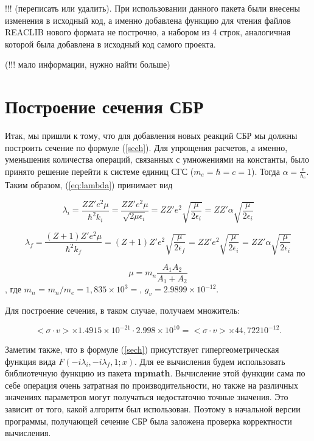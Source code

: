 \documentclass[%
master,    %
natbib,      %
subf,        %
href,        %
colorlinks,  %
]{disser}
\begin{document}
!!! (переписать или удалить). При использовании данного пакета были внесены изменения в исходный код, а именно добавлена функцию для чтения файлов REACLIB нового формата не построчно, а набором из 4 строк, аналогичная которой была добавлена в исходный код самого проекта.

(!!! мало информации, нужно найти больше)

\section{Построение сечения СБР}

Итак, мы пришли к тому, что для добавления новых реакций СБР мы должны построить сечение по формуле (\ref{sech}). Для упрощения расчетов, а именно, уменьшения количества операций, связанных с умножениями на константы, было принято решение перейти к системе единиц СГС ($m_e = \hbar = c = 1$). Тогда $\alpha = \frac{e}{\hbar_c}$. Таким образом, (\ref{eq:lambda}) принимает вид

\begin{equation}
\lambda_i = \frac{Z Z' e^2 \mu}{\hbar^2 k_i} = \frac{Z Z' e^2 \mu}{\sqrt{2\mu \epsilon_i}} = Z Z' e^2 \sqrt{\frac{\mu}{2 \epsilon_i}} = Z Z' \alpha \sqrt{\frac{\mu}{2 \epsilon_i}}
\end{equation}

\begin{equation}
\lambda_f = \frac{(Z+1) Z'  e^2 \mu}{\hbar^2 k_f} = (Z + 1)Z' e^2 \sqrt{\frac{\mu}{2 \epsilon_f}} = Z Z' e^2 \sqrt{\frac{\mu}{2 \epsilon_i}} = Z Z' \alpha \sqrt{\frac{\mu}{2 \epsilon_i}}
\end{equation}

\begin{equation}
\mu = m_n \frac{A_1 A_2}{A_1 + A_2}
\end{equation}
, где $m_n$ =  $m_n/m_e = 1,835\times10^3 =$, $g_v = 2.9899 \times 10^{-12}$.

Для построение сечения, в таком случае, получаем множитель:

$$
	<\sigma \cdot v> \times 1.4915 \times 10^{-21} \cdot 2.998 \times 10^{10} = 	<\sigma \cdot v> \times 44,722 10^{-12}.
$$

Заметим также, что в формуле (\ref{sech}) присутствует гипергеометрическая функция вида $F(-i\lambda_i,-i\lambda_f,1;x)$. Для ее вычисления будем использовать библиотечную функцию из пакета \textbf{mpmath}. Вычисление этой функции сама по себе операция очень затратная по производительности, но также на различных значениях параметров могут получаться недостаточно точные значения. Это зависит от того, какой алгоритм был использован. Поэтому в начальной версии программы, получающей сечение СБР была заложена проверка корректности вычисления. 
\end{document}
